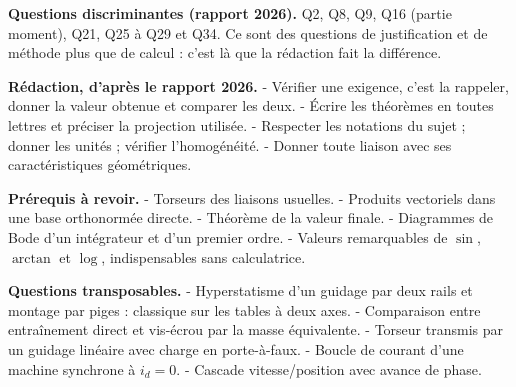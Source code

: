 \documentclass[11pt,a4paper]{article}
\begin{document}
\textbf{Questions discriminantes (rapport 2026).} Q2, Q8, Q9, Q16 (partie moment), Q21, Q25 à Q29 et Q34. Ce sont des questions de justification et de méthode plus que de calcul : c'est là que la rédaction fait la différence.

\textbf{Rédaction, d'après le rapport 2026.}
- Vérifier une exigence, c'est la rappeler, donner la valeur obtenue et comparer les deux.
- Écrire les théorèmes en toutes lettres et préciser la projection utilisée.
- Respecter les notations du sujet ; donner les unités ; vérifier l'homogénéité.
- Donner toute liaison avec ses caractéristiques géométriques.

\textbf{Prérequis à revoir.}
- Torseurs des liaisons usuelles.
- Produits vectoriels dans une base orthonormée directe.
- Théorème de la valeur finale.
- Diagrammes de Bode d'un intégrateur et d'un premier ordre.
- Valeurs remarquables de \(\sin\), \(\arctan\) et \(\log\), indispensables sans calculatrice.

\textbf{Questions transposables.}
- Hyperstatisme d'un guidage par deux rails et montage par piges : classique sur les tables à deux axes.
- Comparaison entre entraînement direct et vis-écrou par la masse équivalente.
- Torseur transmis par un guidage linéaire avec charge en porte-à-faux.
- Boucle de courant d'une machine synchrone à \(i_d = 0\).
- Cascade vitesse/position avec avance de phase.
\end{document}
